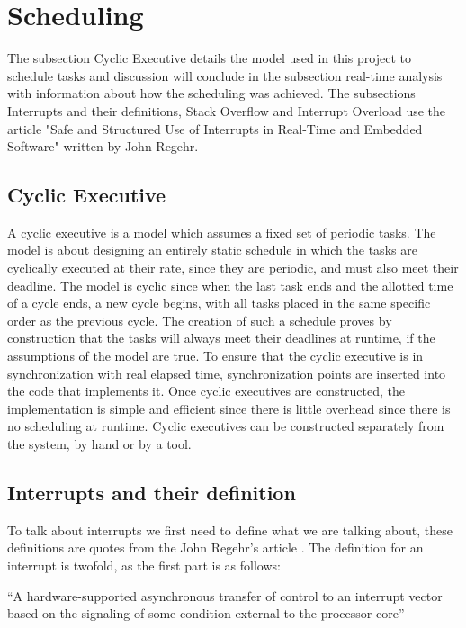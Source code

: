 \section{Scheduling}
\label{sec:Scheduling}
The subsection Cyclic Executive details the model used in this project to schedule tasks and discussion will conclude in the subsection real-time analysis with information about how the scheduling was achieved. 
The subsections Interrupts and their definitions, Stack Overflow and Interrupt Overload use the article "Safe and Structured Use of Interrupts in Real-Time and
Embedded Software" written by John Regehr. \citep{safe}


\subsection{Cyclic Executive}
\label{sec:Cyclic Executive}
A cyclic executive is a model which assumes a fixed set of periodic tasks\citep{rtsbog}. The model is about designing an entirely static schedule in which the tasks are cyclically executed at their rate, since they are periodic, and must also meet their deadline. The model is cyclic since when the last task ends and the allotted time of a cycle ends, a new cycle begins, with all tasks placed in the same specific order as the previous cycle. The creation of such a schedule proves by construction that the tasks will always meet their deadlines at runtime, if the assumptions of the model are true\citep{rtsbog}. \newline
To ensure that the cyclic executive is in synchronization with real elapsed time, synchronization points are inserted into the code that implements it.
Once cyclic executives are constructed, the implementation is simple and efficient since there is little overhead since there is no scheduling at runtime\citep{rtsbog}. Cyclic executives can be constructed separately from the system, by hand or by a tool.

\subsection{Interrupts and their definition}
\label{sec:Interrupts and their definition}
To talk about interrupts we first need to define what we are talking about, these definitions are quotes from the John Regehr's article \citep{safe}. The definition for an interrupt is twofold, as the first part is as follows:

{\addtolength{\leftskip}{10 mm}
	\enquote{A hardware-supported asynchronous transfer of control to an interrupt vector based on the signaling of some condition external to the processor core}
	
}

